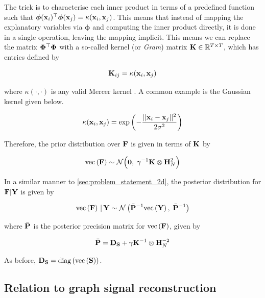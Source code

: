 The trick is to characterise each inner product in terms of a predefined function such that $\boldsymbol{\phi}(\mathbf{x}_i)^\top\boldsymbol{\phi}(\mathbf{x}_j) = \kappa(\mathbf{x}_i, \mathbf{x}_j)$. This means that instead of mapping the explanatory variables via $\boldsymbol{\phi}$ and computing the inner product directly, it is done in a single operation, leaving the mapping implicit. This means we can replace the matrix $\mathbf{\Phi}^\top \mathbf{\Phi}$ with a so-called kernel (or \textit{Gram}) matrix $\mathbf{K} \in \mathbb{R}^{T \times T}$, which has entries defined by 

\begin{equation}
    \label{eq:kernel_matrix}
    \mathbf{K}_{ij} = \kappa(\mathbf{x}_i, \mathbf{x}_j)
\end{equation}

where $\kappa(\cdot, \cdot)$ is any valid Mercer kernel \citep{Rasmussen2005}. A common example is the Gaussian kernel given below. 

\begin{equation}
    \label{eq:gaussian_kernel}
    \kappa(\mathbf{x}_i, \mathbf{x}_j) = \exp\left(-\frac{|| \mathbf{x}_i - \mathbf{x}_j ||^2}{2 \sigma^2}\right)
\end{equation}

Therefore, the prior distribution over $\mathbf{F}$ is given in terms of $\mathbf{K}$ by 

\begin{equation}
    \label{eq:F_prior3}
    \text{\textup{vec}}\left(\mathbf{F}\right) \sim \mathcal{N}\Big(\mathbf{0}, \; \gamma^{-1} \mathbf{K} \otimes \mathbf{H}_N^{2}\Big)
\end{equation}

In a similar manner to \cref{sec:problem_statement_2d}, the posterior distribution for $\mathbf{F} | \mathbf{Y}$ is given by 

\begin{equation}
    \label{eq:F_post_kgr}
    \text{\textup{vec}}\left(\mathbf{F}\right) \, | \, \mathbf{Y} \sim \mathcal{N}\left(\bar{\mathbf{P}}^{-1}\text{\textup{vec}}\left(\mathbf{Y}\right), \; \bar{\mathbf{P}}^{-1}\right)
\end{equation}

where $\bar{\mathbf{P}}$ is the posterior precision matrix for $\text{\textup{vec}}\left(\mathbf{F}\right)$, given by

\begin{equation}
    \label{eq:P_post_kgr}
    \bar{\mathbf{P}} = \mathbf{D}_{\mathbf{S}} + \gamma \mathbf{K}^{-1} \otimes \mathbf{H}_N^{-2}
\end{equation}

As before, $\mathbf{D}_{\mathbf{S}} = \text{\textup{diag}}\left(\text{\textup{vec}}\left(\mathbf{S}\right)\right)$. 

\subsection{Relation to graph signal reconstruction}

